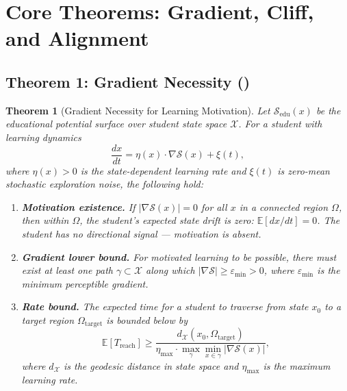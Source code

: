 \documentclass[11pt,a4paper]{article}
\newtheorem{theorem}{Theorem}[section]
\newcommand{\E}{\mathbb{E}}
\newcommand{\cS}{\mathcal{S}}
\newcommand{\gradS}{\nabla\mathcal{S}}
\begin{document}
\section{Core Theorems: Gradient, Cliff, and Alignment}
\label{sec:theorems}
\subsection{Theorem 1: Gradient Necessity ()}
\begin{theorem}[Gradient Necessity for Learning Motivation]
\label{thm:gradient_necessity}
Let $\cS_{\text{edu}}(x)$ be the educational potential surface over student state space $\mathcal{X}$. For a student with learning dynamics
\begin{equation}
    \frac{dx}{dt} = \eta(x) \cdot \gradS(x) + \xi(t),
\end{equation}
where $\eta(x) > 0$ is the state-dependent learning rate and $\xi(t)$ is zero-mean stochastic exploration noise, the following hold:
\begin{enumerate}[label=(\roman*)]
    \item \textbf{Motivation existence.} If $|\gradS(x)| = 0$ for all $x$ in a connected region $\Omega$, then within $\Omega$, the student's expected state drift is zero: $\E[dx/dt] = 0$. The student has no directional signal — motivation is absent.
    \item \textbf{Gradient lower bound.} For motivated learning to be possible, there must exist at least one path $\gamma \subset \mathcal{X}$ along which $|\gradS| \geq \varepsilon_{\text{min}} > 0$, where $\varepsilon_{\text{min}}$ is the minimum perceptible gradient.
    \item \textbf{Rate bound.} The expected time for a student to traverse from state $x_0$ to a target region $\Omega_{\text{target}}$ is bounded below by
    \begin{equation}
        \E[T_{\text{reach}}] \geq \frac{d_{\mathcal{X}}(x_0, \Omega_{\text{target}})}{\eta_{\max} \cdot \max_{\gamma} \min_{x \in \gamma} |\gradS(x)|},
    \end{equation}
    where $d_{\mathcal{X}}$ is the geodesic distance in state space and $\eta_{\max}$ is the maximum learning rate.
\end{enumerate}
\end{theorem}
\end{document}
